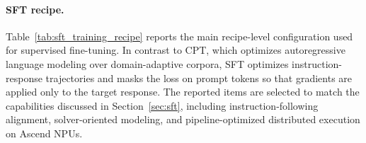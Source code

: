 \paragraph{SFT recipe.}
Table~\ref{tab:sft_training_recipe} reports the main recipe-level configuration
used for supervised fine-tuning. In contrast to CPT, which optimizes
autoregressive language modeling over domain-adaptive corpora, SFT optimizes
instruction-response trajectories and masks the loss on prompt tokens so that
gradients are applied only to the target response. The reported items are
selected to match the capabilities discussed in Section~\ref{sec:sft}, including
instruction-following alignment, solver-oriented modeling, and
pipeline-optimized distributed execution on Ascend NPUs.




